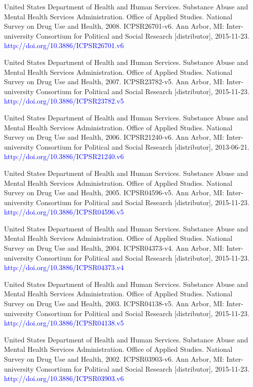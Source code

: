 \documentclass[a4 paper]{article}
\begin{document}
\begin{thebibliography}{1}
	 United States Department of Health and Human Services. Substance Abuse and Mental Health Services Administration. Office of Applied Studies. National Survey on Drug Use and Health, 2008. ICPSR26701-v6. Ann Arbor, MI: Inter-university Consortium for Political and Social Research [distributor], 2015-11-23. \textcolor{blue}{http://doi.org/10.3886/ICPSR26701.v6}
	
	 United States Department of Health and Human Services. Substance Abuse and Mental Health Services Administration. Office of Applied Studies. National Survey on Drug Use and Health, 2007. ICPSR23782-v5. Ann Arbor, MI: Inter-university Consortium for Political and Social Research [distributor], 2015-11-23. \textcolor{blue}{http://doi.org/10.3886/ICPSR23782.v5}
	
	 United States Department of Health and Human Services. Substance Abuse and Mental Health Services Administration. Office of Applied Studies. National Survey on Drug Use and Health, 2006. ICPSR21240-v6. Ann Arbor, MI: Inter-university Consortium for Political and Social Research [distributor], 2013-06-21. \textcolor{blue}{http://doi.org/10.3886/ICPSR21240.v6}
	
	 United States Department of Health and Human Services. Substance Abuse and Mental Health Services Administration. Office of Applied Studies. National Survey on Drug Use and Health, 2005. ICPSR04596-v5. Ann Arbor, MI: Inter-university Consortium for Political and Social Research [distributor], 2015-11-23. \textcolor{blue}{http://doi.org/10.3886/ICPSR04596.v5}
	
	 United States Department of Health and Human Services. Substance Abuse and Mental Health Services Administration. Office of Applied Studies. National Survey on Drug Use and Health, 2004. ICPSR04373-v4. Ann Arbor, MI: Inter-university Consortium for Political and Social Research [distributor], 2015-11-23. \textcolor{blue}{http://doi.org/10.3886/ICPSR04373.v4}
	
	 United States Department of Health and Human Services. Substance Abuse and Mental Health Services Administration. Office of Applied Studies. National Survey on Drug Use and Health, 2003. ICPSR04138-v5. Ann Arbor, MI: Inter-university Consortium for Political and Social Research [distributor], 2015-11-23. \textcolor{blue}{http://doi.org/10.3886/ICPSR04138.v5}
	
	 United States Department of Health and Human Services. Substance Abuse and Mental Health Services Administration. Office of Applied Studies. National Survey on Drug Use and Health, 2002. ICPSR03903-v6. Ann Arbor, MI: Inter-university Consortium for Political and Social Research [distributor], 2015-11-23. \textcolor{blue}{http://doi.org/10.3886/ICPSR03903.v6}
	

\end{thebibliography}
\end{document}
